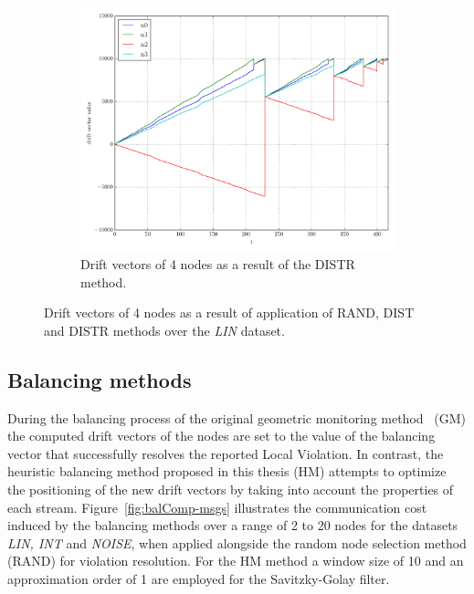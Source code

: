 \begin{figure}[!htb]
\begin{subfigure}{0.32\textwidth}%
  \includegraphics[width=\linewidth]{img/matchings_classic_distroptpair_drifts.pdf}
  \caption{Drift vectors of 4 nodes as a result of the DISTR method.}
\end{subfigure}
\vspace{0.5cm}
\caption{Drift vectors of 4 nodes as a result of application of RAND, DIST and DISTR methods over the \emph{LIN} dataset.} \label{fig:matchingComp-drifts}
\end{figure}

\subsection{Balancing methods} \label{subsec:balComp}

During the balancing process of the original geometric monitoring method~\cite{Sharfman2006GM} (GM) the computed drift vectors of the nodes are set to the value of the balancing vector that successfully resolves the reported Local Violation. In contrast, the heuristic balancing method proposed in this thesis (HM) attempts to optimize the positioning of the new drift vectors by taking into account the properties of each stream. Figure~\ref{fig:balComp-msgs} illustrates the communication cost induced by the balancing methods over a range of 2 to 20 nodes for the datasets \emph{LIN, INT} and \emph{NOISE}, when applied alongside the random node selection method (RAND) for violation resolution. For the HM method a window size of 10 and an approximation order of 1 are employed for the Savitzky-Golay filter.

